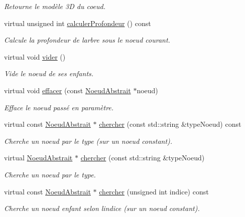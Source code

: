 \begin{DoxyCompactItemize}
\begin{DoxyCompactList}\small\item\em Retourne le modèle 3\+D du coeud. \end{DoxyCompactList}\item 
virtual unsigned int \hyperlink{group__inf2990_gad854800087fd6c13f1a63589caefb41d}{calculer\+Profondeur} () const 
\begin{DoxyCompactList}\small\item\em Calcule la profondeur de l\textquotesingle{}arbre sous le noeud courant. \end{DoxyCompactList}\item 
virtual void \hyperlink{group__inf2990_ga55435ee83860c6a2101334ba67bbd9b6}{vider} ()
\begin{DoxyCompactList}\small\item\em Vide le noeud de ses enfants. \end{DoxyCompactList}\item 
virtual void \hyperlink{group__inf2990_ga2ab3dc520026d1ad77aa848981688bfd}{effacer} (const \hyperlink{class_noeud_abstrait}{Noeud\+Abstrait} $\ast$noeud)
\begin{DoxyCompactList}\small\item\em Efface le noeud passé en paramètre. \end{DoxyCompactList}\item 
virtual const \hyperlink{class_noeud_abstrait}{Noeud\+Abstrait} $\ast$ \hyperlink{group__inf2990_gaeda0df98faf404765d985fcde60fb924}{chercher} (const std\+::string \&type\+Noeud) const 
\begin{DoxyCompactList}\small\item\em Cherche un noeud par le type (sur un noeud constant). \end{DoxyCompactList}\item 
virtual \hyperlink{class_noeud_abstrait}{Noeud\+Abstrait} $\ast$ \hyperlink{group__inf2990_ga0868ae108165b071f6c8a68a7265c770}{chercher} (const std\+::string \&type\+Noeud)
\begin{DoxyCompactList}\small\item\em Cherche un noeud par le type. \end{DoxyCompactList}\item 
virtual const \hyperlink{class_noeud_abstrait}{Noeud\+Abstrait} $\ast$ \hyperlink{group__inf2990_gac334b078c318e39a065b85572778bf13}{chercher} (unsigned int indice) const 
\begin{DoxyCompactList}\small\item\em Cherche un noeud enfant selon l\textquotesingle{}indice (sur un noeud constant). \end{DoxyCompactList}\item 

\end{DoxyCompactItemize}
